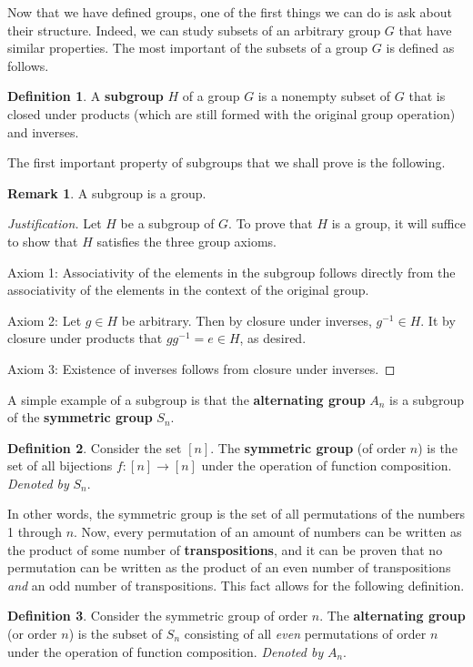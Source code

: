 \documentclass[openany, amssymb, psamsfonts]{amsart}
\theoremstyle{definition}
\newtheorem{defn}{Definition}[section]
\newtheorem{rem}{Remark}[section]
\numberwithin{equation}{section}
\begin{document}
Now that we have defined groups, one of the first things we can do is ask about their structure. Indeed, we can study subsets of an arbitrary group $G$ that have similar properties. The most important of the subsets of a group $G$ is defined as follows.
\begin{defn}
    A \textbf{subgroup} $H$ of a group $G$ is a nonempty subset of $G$ that is closed under products (which are still formed with the original group operation) and inverses.
\end{defn}
The first important property of subgroups that we shall prove is the following.
\begin{rem}
    A subgroup is a group.
    \begin{proof}[Justification]
        Let $H$ be a subgroup of $G$. To prove that $H$ is a group, it will suffice to show that $H$ satisfies the three group axioms.\par\smallskip
        Axiom 1: Associativity of the elements in the subgroup follows directly from the associativity of the elements in the context of the original group.\par
        Axiom 2: Let $g\in H$ be arbitrary. Then by closure under inverses, $g^{-1}\in H$. It by closure under products that $gg^{-1}=e\in H$, as desired.\par
        Axiom 3: Existence of inverses follows from closure under inverses.
    \end{proof}
\end{rem}
A simple example of a subgroup is that the \textbf{alternating group} $A_n$ is a subgroup of the \textbf{symmetric group} $S_n$.
\begin{defn}
    Consider the set $[n]$. The \textbf{symmetric group} (of order $n$) is the set of all bijections $f:[n]\to[n]$ under the operation of function composition. \emph{Denoted by} $S_n$.
\end{defn}
In other words, the symmetric group is the set of all permutations of the numbers 1 through $n$. Now, every permutation of an amount of numbers can be written as the product of some number of \textbf{transpositions}, and it can be proven that no permutation can be written as the product of an even number of transpositions \emph{and} an odd number of transpositions. This fact allows for the following definition.
\begin{defn}
    Consider the symmetric group of order $n$. The \textbf{alternating group} (or order $n$) is the subset of $S_n$ consisting of all \emph{even} permutations of order $n$ under the operation of function composition. \emph{Denoted by} $A_n$.
\end{defn}
\end{document}
